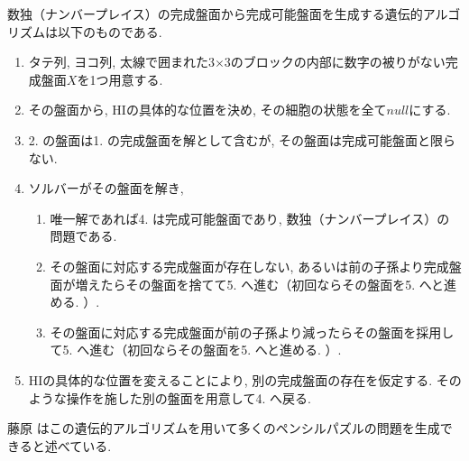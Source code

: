 \begin{example}[遺伝的アルゴリズム]
  数独（ナンバープレイス）の完成盤面から完成可能盤面を生成する遺伝的アルゴリズムは以下のものである.
  \begin{enumerate}
    \item タテ列, ヨコ列, 太線で囲まれた3$\times$3のブロックの内部に数字の被りがない完成盤面$X$を1つ用意する.
    \item その盤面から, HIの具体的な位置を決め, その細胞の状態を全て$null$にする.
    \item 2. の盤面は1. の完成盤面を解として含むが, その盤面は完成可能盤面と限らない.
    \item ソルバーがその盤面を解き,
          \begin{enumerate}
            \item 唯一解であれば4. は完成可能盤面であり, 数独（ナンバープレイス）の問題である.
            \item その盤面に対応する完成盤面が存在しない, あるいは前の子孫より完成盤面が増えたらその盤面を捨てて5. へ進む（初回ならその盤面を5. へと進める. ）.
            \item その盤面に対応する完成盤面が前の子孫より減ったらその盤面を採用して5. へ進む（初回ならその盤面を5. へと進める. ）.
          \end{enumerate}
    \item HIの具体的な位置を変えることにより, 別の完成盤面の存在を仮定する. そのような操作を施した別の盤面を用意して4. へ戻る.
  \end{enumerate}
\end{example}

藤原 \cite{Fujiwara2022}はこの遺伝的アルゴリズムを用いて多くのペンシルパズルの問題を生成できると述べている.

